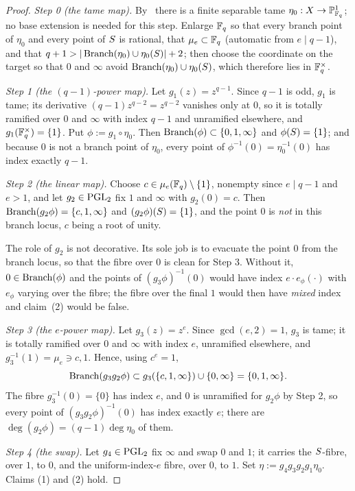 \begin{proof}
\emph{Step 0 (the tame map).} By~\cite[Theorem 1.2]{kedlayalittwitaszek2020tame} there is a finite separable
tame $\eta_0 : X \to \mathbb{P}^1_{\mathbb{F}_q}$; no base extension is needed for this
step. Enlarge $\mathbb{F}_q$ so that every branch point of $\eta_0$ and every point
of $S$ is rational, that $\mu_e \subset \mathbb{F}_q$ (automatic from $e \mid
q-1$), and that $q + 1 > |\operatorname{Branch}(\eta_0) \cup \eta_0(S)| + 2$; then
choose the coordinate on the target so that $0$ and $\infty$ avoid
$\operatorname{Branch}(\eta_0)\cup\eta_0(S)$, which therefore lies in $\mathbb{F}_q^\times$.

\emph{Step 1 (the $(q-1)$-power map).} Let $g_1(z) = z^{q-1}$. Since $q-1$
is odd, $g_1$ is tame; its derivative $(q-1)z^{q-2} = z^{q-2}$ vanishes only
at $0$, so it is totally ramified over $0$ and $\infty$ with index $q-1$ and
unramified elsewhere, and $g_1(\mathbb{F}_q^\times) = \{1\}$. Put $\phi := g_1 \circ
\eta_0$. Then $\operatorname{Branch}(\phi) \subset \{0,1,\infty\}$ and $\phi(S) =
\{1\}$; and because $0$ is not a branch point of $\eta_0$, every point of
$\phi^{-1}(0) = \eta_0^{-1}(0)$ has index exactly $q-1$.

\emph{Step 2 (the linear map).} Choose $c \in \mu_e(\mathbb{F}_q)\setminus\{1\}$,
nonempty since $e \mid q-1$ and $e > 1$, and let $g_2 \in \operatorname{PGL}_2$ fix $1$
and $\infty$ with $g_2(0) = c$. Then $\operatorname{Branch}(g_2\phi) = \{c,1,\infty\}$ and
$(g_2\phi)(S) = \{1\}$, and the point $0$ is \emph{not} in this branch
locus, $c$ being a root of unity.

The role of $g_2$ is not decorative. Its sole job is to evacuate the point
$0$ from the branch locus, so that the fibre over $0$ is clean for Step 3.
Without it, $0 \in \operatorname{Branch}(\phi)$ and the points of $(g_3\phi)^{-1}(0)$
would have index $e\cdot e_\phi(\cdot)$ with $e_\phi$ varying over the
fibre; the fibre over the final $1$ would then have \emph{mixed} index and
claim~(2) would be false.

\emph{Step 3 (the $e$-power map).} Let $g_3(z) = z^e$. Since $\gcd(e,2) =
1$, $g_3$ is tame; it is totally ramified over $0$ and $\infty$ with index
$e$, unramified elsewhere, and $g_3^{-1}(1) = \mu_e \ni c,1$. Hence, using
$c^e = 1$,
\[
  \operatorname{Branch}(g_3g_2\phi) \subset g_3(\{c,1,\infty\}) \cup \{0,\infty\}
  = \{0,1,\infty\} .
\]
The fibre $g_3^{-1}(0) = \{0\}$ has index $e$, and $0$ is unramified for
$g_2\phi$ by Step 2, so every point of $(g_3g_2\phi)^{-1}(0)$ has index
exactly $e$; there are $\deg(g_2\phi) = (q-1)\deg\eta_0$ of them.

\emph{Step 4 (the swap).} Let $g_4 \in \operatorname{PGL}_2$ fix $\infty$ and swap $0$ and
$1$; it carries the $S$-fibre, over $1$, to $0$, and the
uniform-index-$e$ fibre, over $0$, to $1$. Set $\eta := g_4g_3g_2g_1\eta_0$.
Claims (1) and (2) hold.


\end{proof}
